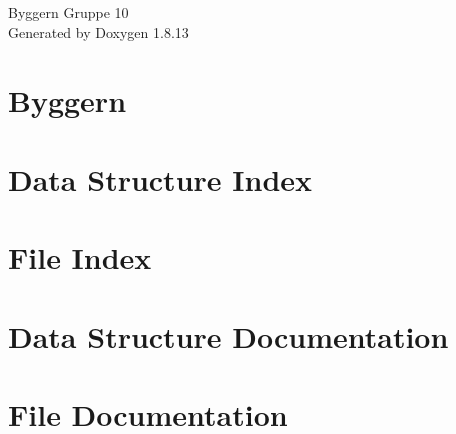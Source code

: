\documentclass[twoside]{book}
\newcommand{\+}{\discretionary{\mbox{\scriptsize$\hookleftarrow$}}{}{}}
\newcommand{\clearemptydoublepage}{%
  \newpage{\pagestyle{empty}\cleardoublepage}%
}
\begin{document}
\hypersetup{pageanchor=false,
             bookmarksnumbered=true,
             pdfencoding=unicode
            }
\begin{titlepage}
\vspace*{7cm}
\begin{center}%
{\Large Byggern Gruppe 10 }\\
\vspace*{1cm}
{\large Generated by Doxygen 1.8.13}\\
\end{center}
\end{titlepage}
\clearemptydoublepage
{}
\tableofcontents
\clearemptydoublepage
{}
\hypersetup{pageanchor=true}

\chapter{Byggern}
\label{md_Node1_README}

\chapter{Data Structure Index}

\chapter{File Index}

\chapter{Data Structure Documentation}









\chapter{File Documentation}












































\backmatter
\newpage
{}
\clearemptydoublepage
{}
\printindex
\end{document}
